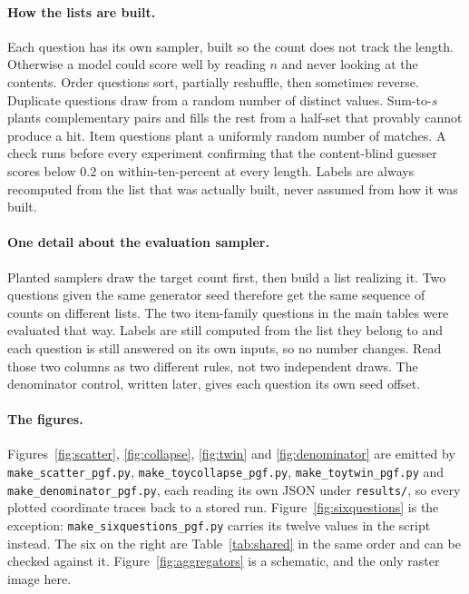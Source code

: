 \documentclass[10pt]{article}
\theoremstyle{definition}
\begin{document}
\begin{appendices}
\paragraph{How the lists are built.} Each question has its own sampler,
built so the count does not track the length. Otherwise a model could score
well by reading $n$ and never looking at the contents. Order questions sort, partially reshuffle, then sometimes reverse.
Duplicate questions draw from a random number of distinct values. Sum-to-$s$
plants complementary pairs and fills the rest from a half-set that provably
cannot produce a hit. Item questions plant a uniformly random number of
matches. A check runs before every experiment confirming that the
content-blind guesser scores below $0.2$ on within-ten-percent at every
length. Labels are always recomputed from the list that was actually built,
never assumed from how it was built.

\paragraph{One detail about the evaluation sampler.} Planted samplers draw
the target count first, then build a list realizing it. Two questions given
the same generator seed therefore get the same sequence of counts on
different lists. The two item-family questions in the main tables were
evaluated that way. Labels are still computed from the list they belong to
and each question is still answered on its own inputs, so no number changes.
Read those two columns as two different rules, not two independent draws.
The denominator control, written later, gives each question its own seed
offset.

\paragraph{The figures.} Figures~\ref{fig:scatter}, \ref{fig:collapse},
\ref{fig:twin} and \ref{fig:denominator} are emitted by
\texttt{make\_scatter\_pgf.py}, \texttt{make\_toycollapse\_pgf.py},
\texttt{make\_toytwin\_pgf.py} and \texttt{make\_denominator\_pgf.py}, each
reading its own JSON under \texttt{results/}, so every plotted coordinate
traces back to a stored run. Figure~\ref{fig:sixquestions} is the exception:
\texttt{make\_sixquestions\_pgf.py} carries its twelve values in the script
instead. The six on the right are Table~\ref{tab:shared} in the same order
and can be checked against it. Figure~\ref{fig:aggregators} is a schematic,
and the only raster image here.


\end{appendices}
\end{document}
